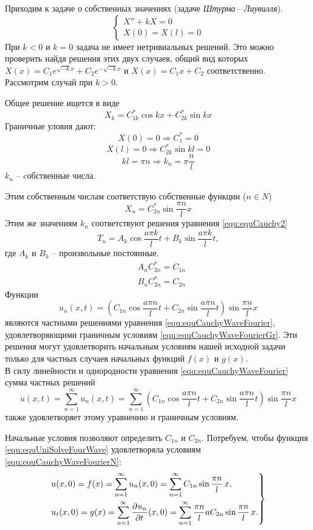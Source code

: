 Приходим к задаче о собственных значениях (задаче \textit{Штурма---Лиувилля}).
\[
	\begin{cases}
		X'' + kX = 0\\
		X(0) = X(l) = 0
	\end{cases}
\]
При $k < 0$ и $k = 0$ задача не имеет нетривиальных решений. Это можно проверить найдя решения этих двух случаев, общий вид которых $X(x) = C_1 e^{\sqrt{-k}x} + C_2 e^{-\sqrt{-k}x}$ и $X(x) = C_1 x + C_2$ соответственно.
Рассмотрим случай при $k > 0$.

Общее решение ищется в виде
\[
	X_k = C_{1k}^* \cos kx + C_{2k}^* \sin k x
\]
Граничные уловия дают:
\[
	X(0) = 0 \Rightarrow C_1^* = 0
\]
\[
	X(l) = 0 \Rightarrow C_{2k}^*\sin k l = 0
\]
\[
	k l=\pi n \Rightarrow k_n=\pi\frac{n}{l}
\]
$k_n$ -- cобственные числа.

Этим собственным числам соответствую собственные функции ($n \in N$)
\[
	X_n= C_{2n}^* \sin \frac{\pi n}{l} x
\]
Этим же значениям $k_n$ соответствуют решения уравнения \eqref{equ:equCauchy2}
\[
	T_n = A_k\cos \frac{a\pi k}{l} t + B_k \sin\frac{a\pi k}{l} t,
\] 
где $A_k$ и $B_k$ -- произвольные постоянные.
\begin{align*}
	&A_n C_{2n}^* =C_{1n}\\
	&B_n C_{2n}^* = C_{2n}
\end{align*}
Функции
\[
	u_n (x, t) = \left(C_{1n} \cos \frac{a \pi n}{l} t + C_{2n} \sin \frac{a \pi n}{l} t \right) \sin\frac{\pi n}{l} x
\]
являются частными решениями уравнения \eqref{equ:equCauchyWaveFourier}, удовлетворяющими граничным условиям \eqref{equ:equCauchyWaveFourierGr}. Эти решения могут удовлетворить начальным условиям нашей исходной задачи только для частных случаев начальных функций $f(x)$ и $g(x)$. \\

В силу линейности и однородности уравнения \eqref{equ:equCauchyWaveFourier} сумма частных решений
\begin{equation}
	u(x, t) = \sum\limits_{n = 1}^{\infty} u_n (x, t) = \sum\limits_{n = 1}^{\infty} \left(C_{1n} \cos \frac{a \pi n}{l} t + C_{2n} \sin \frac{a \pi n}{l} t \right) \sin\frac{\pi n}{l} x
	\label{equ:equUniSolveFourWave}
\end{equation}
также удовлетворяет этому уравнению и граничным условиям. 

Начальные условия позволяют определить $C_{1n}$ и $C_{2n}$. Потребуем, чтобы функция \eqref{equ:equUniSolveFourWave} удовлетворяла условиям \eqref{equ:equCauchyWaveFourierN}:
\begin{equation}
	\left.
	\begin{aligned}
		&u(x, 0) = f(x) = \sum\limits_{n = 1}^{\infty}  u_n(x, 0) = \sum\limits_{n = 1}^{\infty} C_{1n} \sin \frac{\pi n}{l} \, x,\\
		&u_t(x, 0) = g(x) = \sum\limits_{n = 1}^{\infty}  \frac{\partial^{}u_n}{\partial t^{}}(x, 0) = \sum\limits_{n = 1}^{\infty} \frac{\pi n}{l} a C_{2n} \sin \frac{\pi n}{l} \, x.
	\end{aligned}
	\right\}
	\label{equ:equwaveFourier1}
\end{equation}

